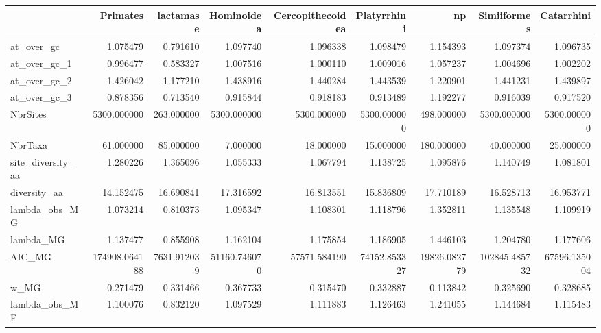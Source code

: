 \begin{tabular}{lrrrrrrrr}
\toprule
{} &       Primates &    lactamase &    Hominoidea & Cercopithecoidea &   Platyrrhini &            np &    Simiiformes &    Catarrhini \\
\midrule
at\_over\_gc        &       1.075479 &     0.791610 &      1.097740 &         1.096338 &      1.098479 &      1.154393 &       1.097374 &      1.096735 \\
at\_over\_gc\_1      &       0.996477 &     0.583327 &      1.007516 &         1.000110 &      1.009016 &      1.057237 &       1.004696 &      1.002202 \\
at\_over\_gc\_2      &       1.426042 &     1.177210 &      1.438916 &         1.440284 &      1.443539 &      1.220901 &       1.441231 &      1.439897 \\
at\_over\_gc\_3      &       0.878356 &     0.713540 &      0.915844 &         0.918183 &      0.913489 &      1.192277 &       0.916039 &      0.917520 \\
NbrSites          &    5300.000000 &   263.000000 &   5300.000000 &      5300.000000 &   5300.000000 &    498.000000 &    5300.000000 &   5300.000000 \\
NbrTaxa           &      61.000000 &    85.000000 &      7.000000 &        18.000000 &     15.000000 &    180.000000 &      40.000000 &     25.000000 \\
site\_diversity\_aa &       1.280226 &     1.365096 &      1.055333 &         1.067794 &      1.138725 &      1.095876 &       1.140749 &      1.081801 \\
diversity\_aa      &      14.152475 &    16.690841 &     17.316592 &        16.813551 &     15.836809 &     17.710189 &      16.528713 &     16.953771 \\
lambda\_obs\_MG     &       1.073214 &     0.810373 &      1.095347 &         1.108301 &      1.118796 &      1.352811 &       1.135548 &      1.109919 \\
lambda\_MG         &       1.137477 &     0.855908 &      1.162104 &         1.175854 &      1.186905 &      1.446103 &       1.204780 &      1.177606 \\
AIC\_MG            &  174908.064188 &  7631.912039 &  51160.746070 &     57571.584190 &  74152.853327 &  19826.082779 &  102845.485732 &  67596.135004 \\
w\_MG              &       0.271479 &     0.331466 &      0.367733 &         0.315470 &      0.332887 &      0.113842 &       0.325690 &      0.328685 \\
lambda\_obs\_MF     &       1.100076 &     0.832120 &      1.097529 &         1.111883 &      1.126463 &      1.241055 &       1.144684 &      1.115483 \\

\end{tabular}
